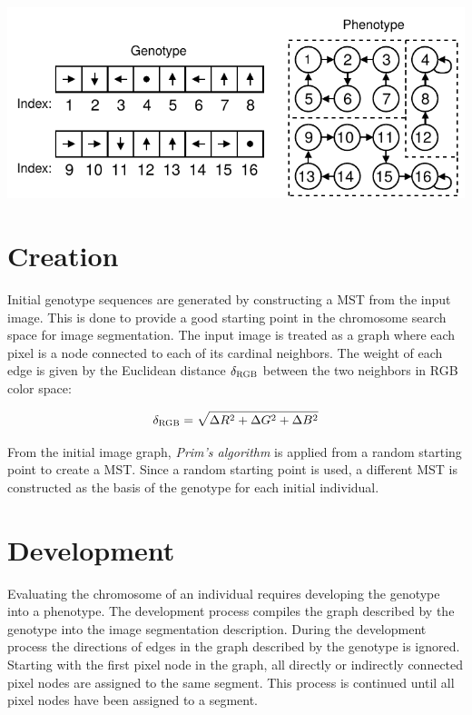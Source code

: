 \documentclass[paper=a4, fontsize=9pt]{scrartcl}
\begin{document}
\begin{multicols}{2}
{
\vspace{0.3cm}
\centering
\includegraphics[scale=0.6]{figures/permve-ntnu-it3708-project-3-2017-representation.pdf}
\label{figure:representation}
\vspace{0.3cm}
}

\section*{Creation}

Initial genotype sequences are generated by constructing a \ac{MST} from the input image. This is done to provide a good starting point in the chromosome search space for image segmentation. The input image is treated as a graph where each pixel is a node connected to each of its cardinal neighbors. The weight of each edge is given by the Euclidean distance $\delta_\textsc{RGB}$ between the two neighbors in RGB color space:

\begin{equation}
\delta_\textsc{RGB} = \sqrt{\Delta R^2 + \Delta G ^2 + \Delta B ^2}
\end{equation}

From the initial image graph, \textit{Prim's algorithm} \cite{prim1957shortest} is applied from a random starting point to create a \ac{MST}. Since a random starting point is used, a different \ac{MST} is constructed as the basis of the genotype for each initial individual.

\section*{Development}

Evaluating the chromosome of an individual requires developing the genotype into a phenotype. The development process compiles the graph described by the genotype into the image segmentation description. During the development process the directions of edges in the graph described by the genotype is ignored. Starting with the first pixel node in the graph, all directly or indirectly connected pixel nodes are assigned to the same segment. This process is continued until all pixel nodes have been assigned to a segment.


\end{multicols}
\end{document}
